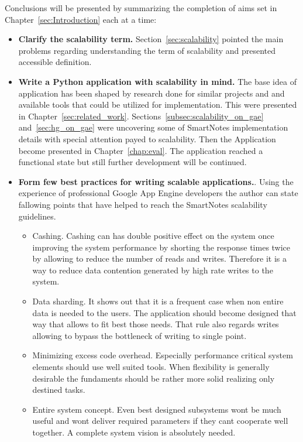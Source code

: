 Conclusions will be presented by summarizing the completion of aims set in Chapter~\ref{sec:Introduction} each at a time:
\begin{itemize}
\item{\textbf{Clarify the scalability term.} Section~\ref{sec:scalability} pointed the main problems regarding understanding the term of scalability and presented accessible definition.}
\item{\textbf{Write a Python application with scalability in mind.} The base idea of application has been shaped by research done for similar projects and and available tools that could be utilized for implementation. This were presented in Chapter~\ref{sec:related_work}. Sections~\ref{subsec:scalability_on_gae} and~\ref{sec:hg_on_gae} were uncovering some of SmartNotes implementation details with special attention payed to scalability. Then the Application become presented in Chapter~\ref{chap:eval}. The application reached a functional state but still further development will be continued.}
\item{\textbf{Form few best practices for writing scalable applications.}. Using the experience of professional Google App Engine developers \cite{gae_best_practices, mike_malone_quote} the author can state fallowing points that have helped to reach the SmartNotes scalability guidelines.
\begin{itemize}
\item{Cashing. Cashing can has double positive effect on the system once improving the system performance by shorting the response times twice by allowing to reduce the number of reads and writes. Therefore it is a way to reduce data contention generated by high rate writes to the system.}
\item{Data sharding. It shows out that it is a frequent case when non entire data is needed to the users. The application should become designed that way that allows to fit best those needs. That rule also regards writes allowing to bypass the bottleneck of writing to single point.}
\item{Minimizing excess code overhead. Especially performance critical system elements should use well suited tools. When flexibility is generally desirable the fundaments should be rather more solid realizing only destined tasks.}
\item{Entire system concept. Even best designed subsystems wont be much useful and wont deliver required parameters if they cant cooperate well together. A complete system vision is absolutely needed.  }
\end{itemize}
}
\end{itemize} 
